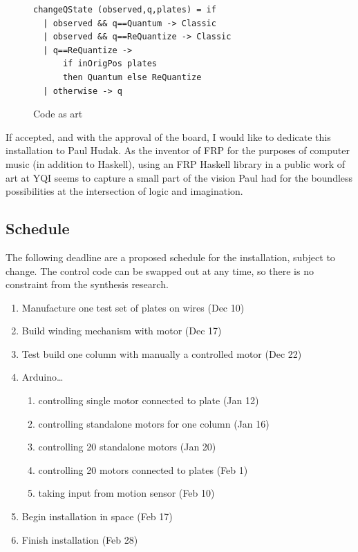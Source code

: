 \begin{figure}
\begin{lstlisting}
changeQState (observed,q,plates) = if
  | observed && q==Quantum -> Classic
  | observed && q==ReQuantize -> Classic
  | q==ReQuantize -> 
      if inOrigPos plates 
      then Quantum else ReQuantize
  | otherwise -> q

\end{lstlisting}
\label{fig:code}
\caption{Code as art}
\end{figure}


If accepted, and with the approval of the board, I would like to dedicate this installation to Paul Hudak.
As the inventor of FRP for the purposes of computer music (in addition to Haskell), using an FRP Haskell library in a public work of art at YQI seems to capture a small part of the vision Paul had for the boundless possibilities at the intersection of logic and imagination.

\subsection{Schedule}

The following deadline are a proposed schedule for the installation, subject to change.
The control code can be swapped out at any time, so there is no constraint from the synthesis research.

\begin{enumerate}
\item Manufacture one test set of plates on wires (Dec 10)
\item Build winding mechanism with motor (Dec 17)
\item Test build one column with manually a controlled motor (Dec 22)
\item Arduino\ldots
  \begin{enumerate}
     \item controlling single motor connected to plate (Jan 12)
     \item controlling standalone motors for one column (Jan 16)
     \item controlling 20 standalone motors (Jan 20)
     \item controlling 20 motors connected to plates (Feb 1)
     \item taking input from motion sensor (Feb 10)
  \end{enumerate}
\item Begin installation in space (Feb 17)
\item Finish installation (Feb 28)
\end{enumerate}

